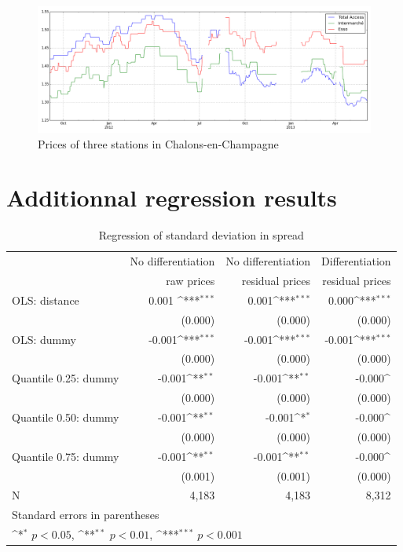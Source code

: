 \documentclass[11pt]{article}
\begin{document}
\ \\
\begin{figure}[H]
    \caption{Prices of three stations in Chalons-en-Champagne}
	\centering
		\includegraphics[width=16cm]{graphs/spurious_total_access_rr.png}
	\floatfoot{}
\end{figure}

\newpage

\section{Additionnal regression results}

\begin{table}[!htbp]\centering
\def\sym#1{\ifmmode^{#1}\else\(^{#1}\)\fi}
\caption{Regression of standard deviation in spread}
\begin{tabular}{lrrr}
\hline
\hline
{} & No differentiation & No differentiation & Differentiation \\
{} & raw prices & residual prices & residual prices \\
\hline
OLS: distance &  0.001 \sym{***}&      0.001\sym{***}&       0.000\sym{***}\\
{} &     (0.000)         &     (0.000)         &     (0.000)   \\
OLS: dummy &  -0.001\sym{***}&      -0.001\sym{***}&     -0.001\sym{***}\\
{} &    (0.000)     &     (0.000)         &     (0.000) \\
Quantile 0.25: dummy     &       -0.001\sym{**}&       -0.001\sym{**}&       -0.000\sym{}\\
{} &     (0.000)       &     (0.000)         &     (0.000)  \\
Quantile 0.50: dummy     &       -0.001\sym{**}&      -0.001\sym{*}&       -0.000\sym{}\\
{} &  (0.000)         &     (0.000)         &     (0.000)    \\
Quantile 0.75: dummy     &       -0.001\sym{**}&     -0.001\sym{**}&       -0.000\sym{}\\
{} &     (0.001)         &     (0.001)         &     (0.000)   \\
\hline
N      &     4,183         &     4,183      &     8,312    \\
\hline\hline
\multicolumn{4}{l}{\footnotesize Standard errors in parentheses}\\
\multicolumn{4}{l}{\footnotesize \sym{*} \(p<0.05\), \sym{**} \(p<0.01\), \sym{***} \(p<0.001\)}\\
\end{tabular}
\end{table}
\end{document}
